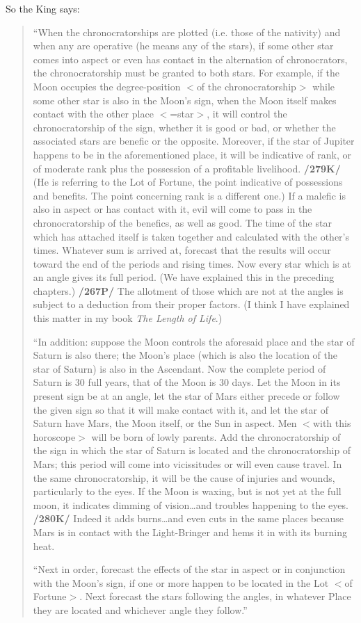 So the King says:
\begin{quote}
“When the chronocratorships are plotted (i.e. those of the nativity) and when any are operative (he means any of the stars), if some other star comes into aspect or even has contact in the alternation of
chronocrators, the chronocratorship must be granted to both stars. For example, if the Moon occupies the degree-position $<$of the chronocratorship$>$ while some other star is also in the Moon’s
sign, when the Moon itself makes contact with the other place $<$=star$>$, it will control the chronocratorship of the sign, whether it is good or bad, or whether the associated stars are benefic or
the opposite. Moreover, if the star of Jupiter happens to be in the aforementioned place, it will be indicative of rank, or of moderate rank plus the possession of a profitable livelihood. \textbf{/279K/} (He is
referring to the Lot of Fortune, the point indicative of possessions and benefits. The point concerning rank is a different one.) If a malefic is also in aspect or has contact with it, evil will come to pass in the chronocratorship of the benefics, as well as good. The time of the star which has attached itself is taken together and calculated with the other’s times. Whatever sum is arrived at, forecast that the results will occur toward the end of the periods and rising times. Now every star
which is at an angle gives its full period. (We have explained this in the preceding chapters.) \textbf{/267P/} The allotment of those which are not at the angles is subject to a deduction from their proper factors. (I think I have explained this matter in my book \textit{The Length of Life}.)

“In addition: suppose the Moon controls the aforesaid place and the star of Saturn is also there; the Moon’s place (which is also the location of the star of Saturn) is also in the Ascendant. Now the
complete period of Saturn is 30 full years, that of the Moon is 30 days. Let the Moon in its present sign be at an angle, let the star of Mars either precede or follow the given sign so that it will make contact with it, and let the star of Saturn have Mars, the Moon itself, or the Sun in aspect. Men $<$with this horoscope$>$ will be born of lowly parents. Add the chronocratorship of the sign in which the star of Saturn is located and the chronocratorship of Mars; this period will come into vicissitudes or will even cause travel. In the same chronocratorship, it will be the cause of injuries and wounds, particularly to the eyes. If the Moon is waxing, but is not yet at the full moon, it indicates dimming of vision…and troubles happening to the eyes. \textbf{/280K/} Indeed it adds burns…and even cuts in the same places because Mars is in contact with the Light-Bringer and hems it in with its burning heat.

“Next in order, forecast the effects of the star in aspect or in conjunction with the Moon’s sign, if one or more happen to be located in the Lot $<$of Fortune$>$. Next forecast the stars following the
angles, in whatever Place they are located and whichever angle they follow.”
\end{quote}

